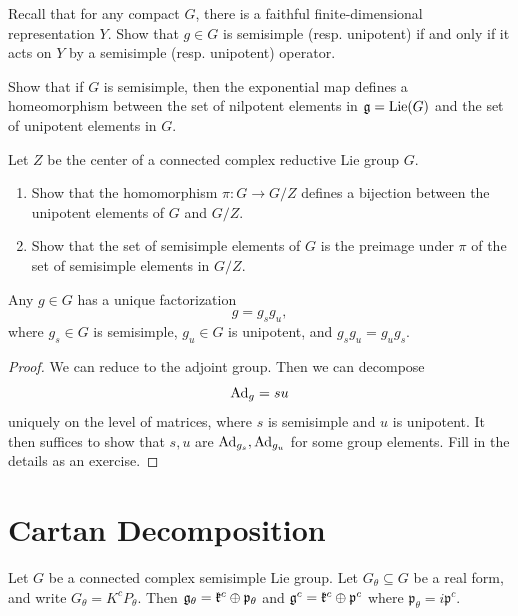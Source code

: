 \begin{exercise}
  Recall that for any compact $G$, there is a faithful
  finite-dimensional representation $Y$.
  Show that $g \in G$
  is semisimple (resp. unipotent) if and only if
  it acts on $Y$ by a semisimple
  (resp. unipotent) operator.
\end{exercise}

\begin{exercise}
  Show that if $G$ is semisimple, then
  the exponential map defines a
  homeomorphism between the set of
  nilpotent elements in $\mathfrak{g} = \operatorname{Lie}(G)$ and
  the set of unipotent elements in $G$.
\end{exercise}

\begin{exercise}
  Let $Z$ be the center of a connected
  complex reductive Lie group $G$.
  \begin{enumerate}
    \item Show that the homomorphism
      $\pi : G \to G / Z$ defines a bijection
      between the unipotent elements of
      $G$ and $G / Z$.
    \item Show that the set of semisimple
      elements of $G$ is the preimage under
      $\pi$ of the set of semisimple
      elements in $G / Z$.
  \end{enumerate}
\end{exercise}

\begin{prop}
  Any $g \in G$ has a unique factorization
  \[
    g = g_s g_u,
  \]
  where $g_s \in G$ is semisimple,
  $g_u \in G$ is unipotent, and
  $g_s g_u = g_u g_s$.
\end{prop}

\begin{proof}
  We can reduce to the adjoint group. Then
  we can decompose
  \[
    \operatorname{Ad}_g = s u
  \]
  uniquely on the level of matrices, where
  $s$ is semisimple and $u$ is unipotent.
  It then suffices to show that
  $s, u$ are $\operatorname{Ad}_{g_s}, \operatorname{Ad}_{g_u}$ for
  some group elements. Fill in the details
  as an exercise.
\end{proof}

\section{Cartan Decomposition}

\begin{remark}
  Let $G$ be a connected complex semisimple
  Lie group. Let $G_\theta \subseteq G$
  be a real form, and write
  $G_\theta = K^c P_\theta$. Then
  $\mathfrak{g}_\theta = \mathfrak{k}^c \oplus \mathfrak{p}_\theta$
  and $\mathfrak{g}^c = \mathfrak{k}^c \oplus \mathfrak{p}^c$
  where $\mathfrak{p}_\theta = i \mathfrak{p}^c$.
\end{remark}

